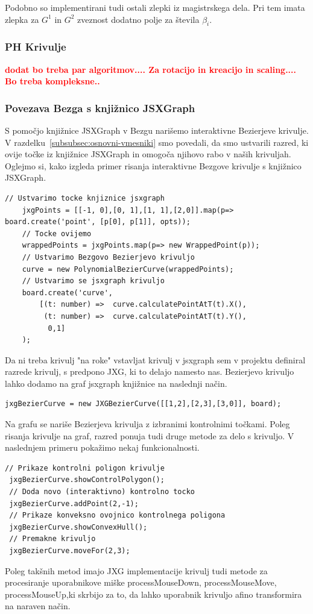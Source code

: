 \documentclass[isrm2, tisk]{fmfdelo}
\newcommand{\mycomment}[1]{\textbf{\textcolor{red}{#1}}}
\begin{document}
    Podobno so implementirani tudi ostali zlepki iz magistrskega dela.
    Pri tem imata zlepka za $G^1$ in $G^2$ zveznost dodatno polje za števila $\beta_i$.
    \subsubsection{PH Krivulje}
    \mycomment{dodat bo treba par algoritmov.... Za rotacijo in kreacijo in scaling.... Bo treba kompleksne..}

    \subsubsection{Povezava Bezga s knjižnico JSXGraph}
    S pomočjo knjižnice JSXGraph v Bezgu narišemo interaktivne Bezierjeve krivulje.
    V razdelku~\ref{subsubsec:osnovni-vmesniki} smo povedali, da smo ustvarili razred, ki ovije točke iz knjižnice JSXGraph in omogoča njihovo rabo v naših krivuljah.
    Oglejmo si, kako izgleda primer risanja interaktivne Bezgove krivulje s knjižnico JSXGraph.
    \begin{lstlisting}[label={lst:ghdfg}]
    // Ustvarimo tocke knjiznice jsxgraph
    jxgPoints = [[-1, 0],[0, 1],[1, 1],[2,0]].map(p=> board.create('point', [p[0], p[1]], opts));
    // Tocke ovijemo
    wrappedPoints = jxgPoints.map(p=> new WrappedPoint(p));
    // Ustvarimo Bezgovo Bezierjevo krivuljo
    curve = new PolynomialBezierCurve(wrappedPoints);
    // Ustvarimo se jsxgraph krivuljo
    board.create('curve',
        [(t: number) =>  curve.calculatePointAtT(t).X(),
         (t: number) =>  curve.calculatePointAtT(t).Y(),
          0,1]
    );
    \end{lstlisting}
    Da ni treba krivulj "na roke" vstavljat krivulj v jsxgraph sem v projektu definiral razrede krivulj, s predpono JXG, ki to delajo namesto nas.
    Bezierjevo krivuljo lahko dodamo na graf jsxgraph knjižnice na naslednji način.
    \begin{lstlisting}[label={lst:ghdfg}]
 jxgBezierCurve = new JXGBezierCurve([[1,2],[2,3],[3,0]], board);
    \end{lstlisting}
    Na grafu se nariše Bezierjeva krivulja z izbranimi kontrolnimi točkami.
    Poleg risanja krivulje na graf, razred ponuja tudi druge metode za delo s krivuljo.
    V naslednjem primeru pokažimo nekaj funkcionalnosti.
\begin{lstlisting}[label={lst:ghdfg}]
 // Prikaze kontrolni poligon krivulje
 jxgBezierCurve.showControlPolygon();
 // Doda novo (interaktivno) kontrolno tocko
 jxgBezierCurve.addPoint(2,-1);
 // Prikaze konveksno ovojnico kontrolnega poligona
 jxgBezierCurve.showConvexHull();
 // Premakne krivuljo
 jxgBezierCurve.moveFor(2,3);
    \end{lstlisting}
    Poleg takšnih metod imajo JXG implementacije krivulj tudi metode za procesiranje uporabnikove miške processMouseDown, processMouseMove, processMouseUp,ki skrbijo za to, da lahko uporabnik krivuljo afino transformira na naraven način.
\end{document}
